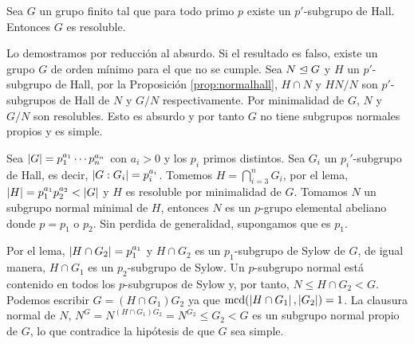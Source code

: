 \begin{teorema}%
	Sea $G$ un grupo finito tal que para todo primo $p$ existe un $p'$-subgrupo de Hall. Entonces $G$ es resoluble.
	\begin{demostracion}
		Lo demostramos por reducción al absurdo. Si el resultado es falso, existe un grupo $G$ de orden mínimo para el que no se cumple. Sea $N\trianglelefteq G$ y $H$ un $p'$-subgrupo de Hall, por la Proposición \ref{prop:normalhall}, $H\cap N$ y $HN/N$ son $p'$-subgrupos de Hall de $N$ y $G/N$ respectivamente. Por minimalidad de $G$, $N$ y $G/N$ son resolubles. Esto es absurdo y por tanto $G$ no tiene subgrupos normales propios y es simple.
		
		Sea $\left|G\right| = p_1^{a_1}\cdots p_n^{a_n}$ con $a_i>0$ y los $p_i$ primos distintos. Sea $G_i$ un $p_i'$-subgrupo de Hall, es decir, $\left|G:G_i\right| = p_i^{a_i}$. Tomemos $H=\bigcap_{i=3}^{n} G_i$, por el lema, $\left|H\right|=p_1^{a_1}p_2^{a_2} < \left|G\right|$ y $H$ es resoluble por minimalidad de $G$. Tomamos $N$ un subgrupo normal minimal de $H$, entonces $N$ es un $p$-grupo elemental abeliano donde $p=p_1$ o $p_2$. Sin perdida de generalidad, supongamos que es $p_1$.
		
		Por el lema, $\left|H\cap G_2\right| = p_1^{a_1}$ y $H\cap G_2$ es un $p_1$-subgrupo de Sylow de $G$, de igual manera, $H\cap G_1$ es un $p_2$-subgrupo de Sylow. Un $p$-subgrupo normal está contenido en todos los $p$-subgrupos de Sylow y, por tanto, $N \leq H\cap G_2 < G$. Podemos escribir $G=(H\cap G_1)G_2$ ya que $\operatorname{mcd}(\left|H\cap G_1\right|,\left|G_2\right|) = 1$. La clausura normal de $N$, $N^{G} = N^{(H\cap G_1)G_2} = N^{G_2}\leq G_2 < G$ es un subgrupo normal propio de $G$, lo que contradice la hipótesis de que $G$ sea simple.
		
	\end{demostracion}
\end{teorema}